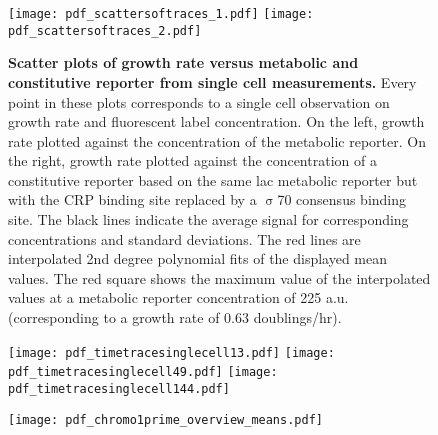 
\begin{figure}%
	\centering
	\texttt{[image: pdf\_scattersoftraces\_1.pdf]}
	\texttt{[image: pdf\_scattersoftraces\_2.pdf]}	
	\caption{ 
		\textbf{Scatter plots of growth rate versus metabolic and constitutive reporter from single cell measurements.}
		Every point in these plots corresponds to a single cell observation on growth rate and fluorescent label concentration.
		On the left, growth rate plotted against the concentration of the metabolic reporter.
		On the right, growth rate plotted against the concentration of a constitutive reporter based on the same lac metabolic reporter but with the CRP binding site replaced by a $\upsigma$70 consensus binding site.
		The black lines indicate the average signal for corresponding concentrations and standard deviations.
		The red lines are interpolated 2nd degree polynomial fits of the displayed mean values.
		The red square shows the maximum value of the interpolated values at a metabolic reporter concentration of 225 a.u. (corresponding to a growth rate of 0.63 doublings/hr).
	}
	\label{fig:CRP:scatterspulsing}
\end{figure}%


\begin{figure}%
	\centering
	\texttt{[image: pdf\_timetracesinglecell13.pdf]}
	\texttt{[image: pdf\_timetracesinglecell49.pdf]}
	\texttt{[image: pdf\_timetracesinglecell144.pdf]}
	\clearpage %
	\label{fig:CRP:timevolutionCRPgrowthsinglecell}
\end{figure}	

\clearpage





\begin{figure}
	\centering
	\texttt{[image: pdf\_chromo1prime\_overview\_means.pdf]}
	\clearpage %
	\label{fig:CRP:overviewsummaryparams}
\end{figure}	

